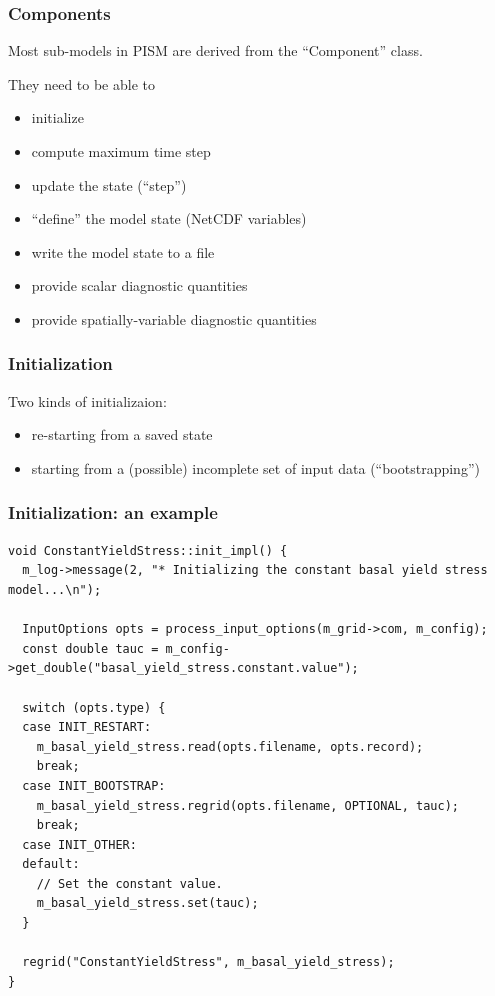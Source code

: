 \documentclass[hide notes,intlimits]{beamer}
\begin{document}
\begin{frame}
  \frametitle{Components}

  Most sub-models in PISM are derived from the ``Component'' class.

  They need to be able to
  \begin{itemize}
  \item initialize
  \item compute maximum time step
  \item update the state (``step'')
  \item ``define'' the model state (NetCDF variables)
  \item write the model state to a file
  \item<2> provide scalar diagnostic quantities
  \item<2> provide spatially-variable diagnostic quantities
  \end{itemize}
  
\end{frame}

\begin{frame}
  \frametitle{Initialization}

  Two kinds of initializaion:
  \begin{itemize}
  \item re-starting from a saved state
  \item starting from a (possible) incomplete set of input data
    (``bootstrapping'')
  \end{itemize}
\end{frame}

\begin{frame}
  \frametitle{Initialization: an example}
\begin{lstlisting}
void ConstantYieldStress::init_impl() {
  m_log->message(2, "* Initializing the constant basal yield stress model...\n");

  InputOptions opts = process_input_options(m_grid->com, m_config);
  const double tauc = m_config->get_double("basal_yield_stress.constant.value");

  switch (opts.type) {
  case INIT_RESTART:
    m_basal_yield_stress.read(opts.filename, opts.record);
    break;
  case INIT_BOOTSTRAP:
    m_basal_yield_stress.regrid(opts.filename, OPTIONAL, tauc);
    break;
  case INIT_OTHER:
  default:
    // Set the constant value.
    m_basal_yield_stress.set(tauc);
  }

  regrid("ConstantYieldStress", m_basal_yield_stress);
}
\end{lstlisting}
\end{frame}
\end{document}
